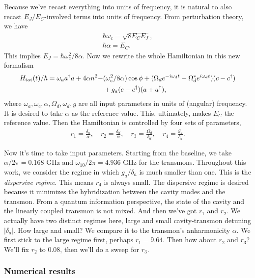 \documentclass{article}
\begin{document}
Because we've recast everything into units of frequency, it is natural to also recast $E_J/E_C$-involved terms into units of frequency. From perturbation theory, we have
\begin{align}
    \hbar\omega_c = \sqrt{8E_CE_J},\\
    \hbar\alpha = E_C.
\end{align}
This implies $E_J=\hbar\omega^2_c/8\alpha$. Now we rewrite the whole Hamiltonian in this new formalism
\begin{align}
    H_{\text{tot}}(t)/\hbar = \omega_a a^\dagger a + 4\alpha n^2 - &(\omega_c^2/8\alpha)\cos\phi +(\Omega_de^{-i\omega_d t}-\Omega_d^*e^{i\omega_d t})(c-c^\dagger)\notag\\
    &+g_a(c-c^\dagger)(a+a^\dagger),
\end{align}
where $\omega_a, \omega_c, \alpha, \Omega_d, \omega_d, g$ are all input parameters in units of (angular) frequency. It is desired to take $\alpha$ as the reference value. This, ultimately, makes $E_C$ the reference value. Then the Hamiltonian is controlled by four sets of parameters,
\begin{align}
    r_1 = \frac{\delta_a}{\alpha},\quad r_2 = \frac{\delta_d}{\alpha},\quad r_3 = \frac{\Omega_d}{\delta_d},\quad r_4 = \frac{g_a}{\delta_a}. 
\end{align}

Now it's time to take input parameters. Starting from the baseline, we take $\alpha/2\pi=0.168$ GHz and $\omega_{10}/2\pi=4.936$ GHz for the transmons. Throughout this work, we consider the regime in which $g_a/\delta_a$ is much smaller than one. This is the \textit{dispersive regime}. This means $r_4$ is always small. The dispersive regime is desired because it minimizes the hybridization between the cavity modes and the transmon. From a quantum information perspective, the state of the cavity and the linearly coupled transmon is not mixed. And then we've got $r_1$ and $r_2$. We actually have two distinct regimes here, large and small cavity-transmon detuning $|\delta_a|$. How large and small? We compare it to the transmon's anharmonicity $\alpha$. We first stick to the large regime first, perhaps $r_1=9.64$. Then how about $r_2$ and $r_3$? We'll fix $r_2$ to $0.08$, then we'll do a sweep for $r_3$. 

\subsubsection{Numerical results}
\end{document}
